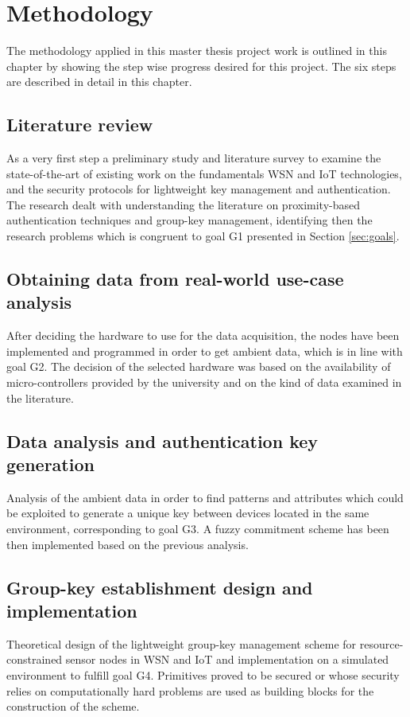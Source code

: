 \chapter{Methodology}
\label{ch:methodology}
The methodology applied in this master thesis project work is outlined in this chapter by showing the step wise progress desired for this project. The six steps are described in detail in this chapter.

\section{Literature review}
As a very first step a preliminary study and literature survey to examine the state-of-the-art of existing work on the fundamentals WSN and IoT technologies, and the security protocols for lightweight key management and authentication. 
The research dealt with understanding the literature on proximity-based authentication techniques and group-key management, identifying then the research problems which is congruent to goal G1 presented in Section \ref{sec:goals}.

\section{Obtaining data from real-world use-case analysis}
After deciding the hardware to use for the data acquisition, the nodes have been implemented and programmed in order to get ambient data, which is in line with goal G2. 
The decision of the selected hardware was based on the availability of micro-controllers provided by the university and on the kind of data examined in the literature.


\section{Data analysis and authentication key generation}
Analysis of the ambient data in order to find patterns and attributes which could be exploited to generate a unique key between devices located in the same environment, corresponding to goal G3. 
A fuzzy commitment scheme has been then implemented based on the previous analysis. 


\section{Group-key establishment design and implementation}
Theoretical design of the lightweight group-key management scheme for resource-constrained sensor nodes in WSN and IoT and implementation on a simulated environment to fulfill goal G4.
Primitives proved to be secured or whose security relies on computationally hard problems are used as building blocks for the construction of the scheme.


